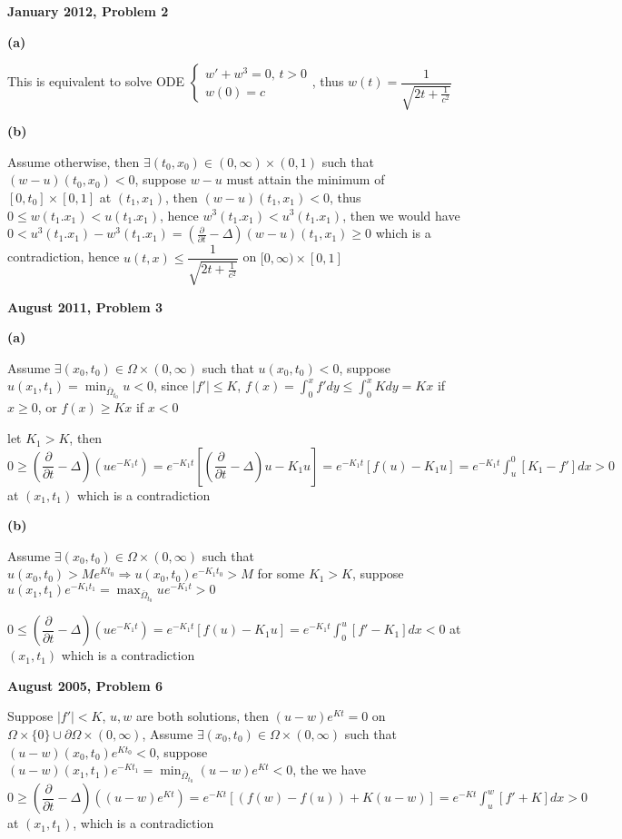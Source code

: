 \documentclass[12pt]{article}
\begin{document}
\textbf{January 2012, Problem 2} \par
\textbf{(a)} \par
This is equivalent to solve ODE $
\left\{\begin{matrix}
w'+w^{3}=0,\,t>0\\ 
w(0)=c
\end{matrix}\right.
$, thus $w(t)=\dfrac{1}{\sqrt{2t+\frac{1}{c^{2}}}}$ \par
\textbf{(b)} \par
Assume otherwise, then $\exists (t_0,x_0)\in (0,\infty)\times (0,1)$ such that $(w-u)(t_0,x_0)<0$, suppose $w-u$ must attain the minimum of $[0,t_0]\times [0,1]$ at $(t_1,x_1)$, then $(w-u)(t_1,x_1)<0$, thus $0\leq w(t_1.x_1)<u(t_1.x_1)$, hence $w^3(t_1.x_1)<u^3(t_1.x_1)$, then we would have $0<u^3(t_1.x_1)-w^3(t_1.x_1)=(\frac{\partial}{\partial t}-\Delta)(w-u)(t_1,x_1)\geq 0$ which is a contradiction, hence $u(t,x)\leq \dfrac{1}{\sqrt{2t+\frac{1}{c^{2}}}}$ on $[0,\infty)\times[0,1]$ \par
\textbf{August 2011, Problem 3} \par
\textbf{(a)} \par
Assume $\exists (x_0,t_0)\in\Omega\times(0,\infty)$ such that $u(x_0,t_0)<0$, suppose $u(x_1,t_1)=\min_{\bar{\Omega}_{t_0}}u<0$, since $|f'|\leq K$, $\displaystyle f(x)=\int_0^xf'dy\leq\int_0^xKdy=Kx$ if $x\geq0$, or $f(x)\geq Kx$ if $x<0$ \par
let $K_1>K$, then $
0\geq\left(\dfrac{\partial}{\partial t}-\Delta\right)\left(ue^{-K_1t}\right)
=e^{-K_1t}\left[\left(\dfrac{\partial}{\partial t}-\Delta\right)u-K_1u\right] 
=e^{-K_1t}\left[f(u)-K_1u\right]
=e^{-K_1t}\displaystyle\int_u^0\left[K_1-f'\right]dx>0$ at $(x_1,t_1)$ which is a contradiction \par
\textbf{(b)} \par
Assume $\exists (x_0,t_0)\in\Omega\times(0,\infty)$ such that $u(x_0,t_0)>Me^{Kt_0}\Rightarrow u(x_0,t_0)e^{-K_1t_0}>M$ for some $K_1>K$, suppose $u(x_1,t_1)e^{-K_1t_1}=\max_{\bar{\Omega}_{t_0}}ue^{-K_1t}>0$ \par
$0\leq\left(\dfrac{\partial}{\partial t}-\Delta\right)\left(ue^{-K_1t}\right)
=e^{-K_1t}\left[f(u)-K_1u\right]=e^{-K_1t}\displaystyle\int_0^u\left[f'-K_1\right]dx<0 $ at $(x_1,t_1)$ which is a contradiction \par
\textbf{August 2005, Problem 6} \par
Suppose $|f'|<K$, $u,w$ are both solutions, then $(u-w)e^{Kt}=0$ on $\Omega\times\{0\}\cup\partial\Omega\times(0,\infty)$, Assume $\exists (x_0,t_0)\in\Omega\times(0,\infty)$ such that $(u-w)(x_0,t_0)e^{Kt_0}<0$, suppose $(u-w)(x_1,t_1)e^{-Kt_1}=\min_{\bar{\Omega}_{t_0}}(u-w)e^{Kt}<0$, the we have
 $
0\geq\left(\dfrac{\partial}{\partial t}-\Delta\right)\left((u-w)e^{Kt}\right)
=e^{-Kt}\left[\left(f(w)-f(u)\right)+K(u-w)\right]
=e^{-Kt}\displaystyle\int_u^w\left[f'+K\right]dx>0 $ at $(x_1,t_1)$, which is a contradiction
\end{document}
